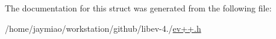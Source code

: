 \-The documentation for this struct was generated from the following file\-:\begin{DoxyCompactItemize}
\item 
/home/jaymiao/workstation/github/libev-\/4./\hyperlink{ev_09_09_8h}{ev++.\-h}\end{DoxyCompactItemize}
